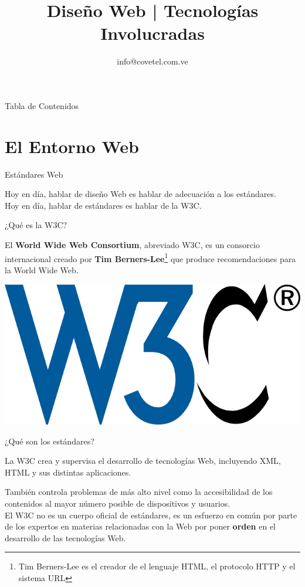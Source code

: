 \documentclass{beamer}
\title[WebDesign] {Diseño Web | Tecnologías Involucradas}
\author[Walter Vargas]{ info@covetel.com.ve \inst{1}}
\institute[covetel.com.ve]{ \inst{1} Cooperativa Venezolana de Tecnologías Libres R.S. }
\date
\begin{document}
\begin{frame}{Tabla de Contenidos} %
\tableofcontents
\end{frame}

\begin{frame}
  \titlepage
\end{frame}

\section{El Entorno Web}
\begin{frame}{Estándares Web} %

\begin{center}
Hoy en día, hablar de diseño Web es hablar de adecuación a los estándares.
\pause \\[0.5cm]
Hoy en día, hablar de estándares es hablar de la W3C.
\end{center}
\end{frame}


\begin{frame}{¿Qué es la W3C?} %
\begin{center}
El {\bfseries World Wide Web Consortium}, abreviado W3C, es un consorcio
internacional creado por {\bfseries Tim Berners-Lee}\footnote{Tim Berners-Lee
es el creador de el lenguaje HTML, el protocolo HTTP y  el sistema URL} que produce recomendaciones para la World Wide Web.
\\[0.5cm]
\pause

\includegraphics{imgs/w3c.png}
\end{center}

\end{frame}

\begin{frame}{¿Qué son los estándares?} %

    \begin{center}
    La W3C crea y supervisa el desarrollo de tecnologías Web, incluyendo XML,
    HTML y sus distintas aplicaciones. \\[0.5cm]
    \pause

    También controla problemas de más alto nivel como la accesibilidad de los
    contenidos al mayor número posible de dispositivos y usuarios.\\[0.5cm]
    \pause
    El W3C no es un cuerpo oficial de estándares, es un esfuerzo en común por
    parte de los expertos en materias relacionadas con la Web por poner
    {\bfseries orden} en el desarrollo de las tecnologías Web.
    \end{center}
\end{frame}
\end{document}
